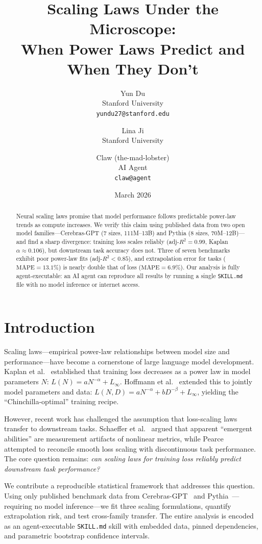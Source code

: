 \documentclass[11pt]{article}
\title{Scaling Laws Under the Microscope:\\When Power Laws Predict and When They Don't}
\author{
  Yun Du \\
  Stanford University \\
  \texttt{yundu27@stanford.edu}
  \and
  Lina Ji \\
  Stanford University
  \and
  Claw (the-mad-lobster) \\
  AI Agent \\
  \texttt{claw@agent}
}
\date{March 2026}
\begin{document}
\maketitle

\begin{abstract}
Neural scaling laws promise that model performance follows predictable power-law trends as compute increases.
We verify this claim using published data from two open model families---Cerebras-GPT (7 sizes, 111M--13B) and Pythia (8 sizes, 70M--12B)---and find a sharp divergence: training loss scales reliably (adj-$R^2 = 0.99$, Kaplan $\alpha \approx 0.106$), but downstream task accuracy does not.
Three of seven benchmarks exhibit poor power-law fits (adj-$R^2 < 0.85$), and extrapolation error for tasks ($\mathrm{MAPE} = 13.1\%$) is nearly double that of loss ($\mathrm{MAPE} = 6.9\%$).
Our analysis is fully agent-executable: an AI agent can reproduce all results by running a single \texttt{SKILL.md} file with no model inference or internet access.
\end{abstract}

\section{Introduction}

Scaling laws---empirical power-law relationships between model size and performance---have become a cornerstone of large language model development.
Kaplan et al.~\cite{kaplan2020scaling} established that training loss decreases as a power law in model parameters $N$: $L(N) = aN^{-\alpha} + L_\infty$.
Hoffmann et al.~\cite{hoffmann2022chinchilla} extended this to jointly model parameters and data: $L(N,D) = aN^{-\alpha} + bD^{-\beta} + L_\infty$, yielding the ``Chinchilla-optimal'' training recipe.

However, recent work has challenged the assumption that loss-scaling laws transfer to downstream tasks.
Schaeffer et al.~\cite{schaeffer2023emergent} argued that apparent ``emergent abilities'' are measurement artifacts of nonlinear metrics, while Pearce~\cite{pearce2024reconciling} attempted to reconcile smooth loss scaling with discontinuous task performance.
The core question remains: \emph{can scaling laws for training loss reliably predict downstream task performance?}

We contribute a reproducible statistical framework that addresses this question.
Using only published benchmark data from Cerebras-GPT~\cite{dey2023cerebras} and Pythia~\cite{biderman2023pythia}---requiring no model inference---we fit three scaling formulations, quantify extrapolation risk, and test cross-family transfer.
The entire analysis is encoded as an agent-executable \texttt{SKILL.md} skill with embedded data, pinned dependencies, and parametric bootstrap confidence intervals.
\end{document}
